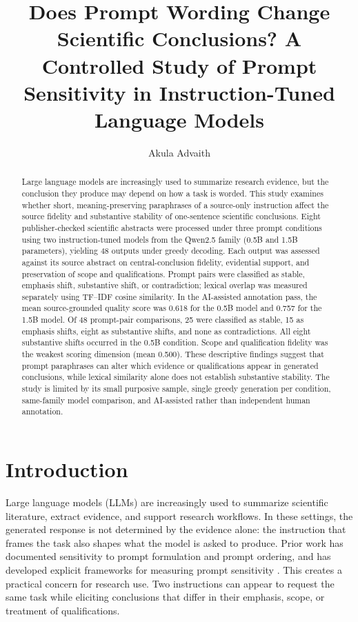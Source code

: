\documentclass[acmsmall,screen,nonacm]{acmart}
\title{Does Prompt Wording Change Scientific Conclusions? A Controlled Study of Prompt Sensitivity in Instruction-Tuned Language Models}
\author{Akula Advaith}
\affiliation{%
  \institution{Indian Institute of Information Technology Allahabad}
  \city{Prayagraj}
  \country{India}}
\begin{document}
\begin{abstract}
Large language models are increasingly used to summarize research evidence, but the conclusion they produce may depend on how a task is worded. This study examines whether short, meaning-preserving paraphrases of a source-only instruction affect the source fidelity and substantive stability of one-sentence scientific conclusions. Eight publisher-checked scientific abstracts were processed under three prompt conditions using two instruction-tuned models from the Qwen2.5 family (0.5B and 1.5B parameters), yielding 48 outputs under greedy decoding. Each output was assessed against its source abstract on central-conclusion fidelity, evidential support, and preservation of scope and qualifications. Prompt pairs were classified as stable, emphasis shift, substantive shift, or contradiction; lexical overlap was measured separately using TF--IDF cosine similarity. In the AI-assisted annotation pass, the mean source-grounded quality score was 0.618 for the 0.5B model and 0.757 for the 1.5B model. Of 48 prompt-pair comparisons, 25 were classified as stable, 15 as emphasis shifts, eight as substantive shifts, and none as contradictions. All eight substantive shifts occurred in the 0.5B condition. Scope and qualification fidelity was the weakest scoring dimension (mean 0.500). These descriptive findings suggest that prompt paraphrases can alter which evidence or qualifications appear in generated conclusions, while lexical similarity alone does not establish substantive stability. The study is limited by its small purposive sample, single greedy generation per condition, same-family model comparison, and AI-assisted rather than independent human annotation.
\end{abstract}


\maketitle

\section{Introduction}
Large language models (LLMs) are increasingly used to summarize scientific literature, extract evidence, and support research workflows. In these settings, the generated response is not determined by the evidence alone: the instruction that frames the task also shapes what the model is asked to produce. Prior work has documented sensitivity to prompt formulation and prompt ordering, and has developed explicit frameworks for measuring prompt sensitivity \cite{lu2022,zhuo2024,schulhoff2024}. This creates a practical concern for research use. Two instructions can appear to request the same task while eliciting conclusions that differ in their emphasis, scope, or treatment of qualifications.
\end{document}
